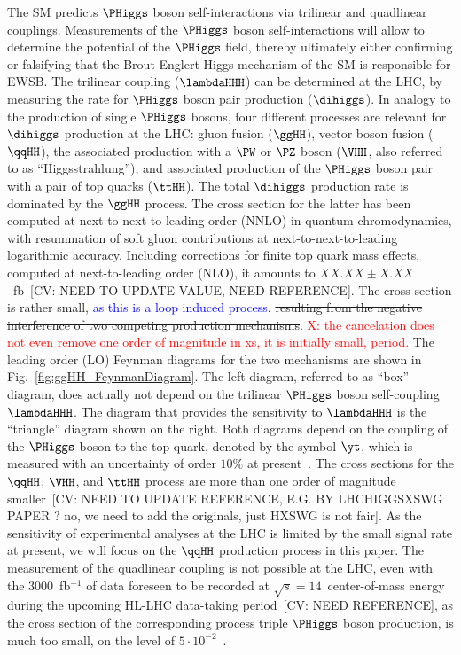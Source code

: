 The SM predicts $\PHiggs$ boson self-interactions via trilinear and quadlinear couplings. 
Measurements of the $\PHiggs$ boson self-interactions will allow to determine the potential of the $\PHiggs$ field,
thereby ultimately either confirming or falsifying that the Brout-Englert-Higgs mechanism of the SM is responsible for EWSB.
The trilinear coupling ($\lambdaHHH$) can be determined at the LHC, by measuring the rate for $\PHiggs$ boson pair production ($\dihiggs$). 
In analogy to the production of single $\PHiggs$ bosons, 
four different processes are relevant for $\dihiggs$ production at the LHC: 
gluon fusion ($\ggHH$), vector boson fusion ($\qqHH$), the associated production with a $\PW$ or $\PZ$ boson ($\VHH$, also referred to as ``Higgsstrahlung''),
and associated production of the $\PHiggs$ boson pair with a pair of top quarks ($\ttHH$).
The total $\dihiggs$ production rate is dominated by the $\ggHH$ process.
The cross section for the latter has been computed at next-to-next-to-leading order (NNLO) in quantum chromodynamics,
with resummation of soft gluon contributions at next-to-next-to-leading logarithmic accuracy.
Including corrections for finite top quark mass effects, computed at next-to-leading order (NLO),
it amounts to $XX.XX \pm X.XX$~fb~\cite{}[CV: NEED TO UPDATE VALUE, NEED REFERENCE].
The cross section is rather small, \textcolor{blue}{as this is a loop induced process.} \st{resulting from the negative interference of two competing production mechanisms}. \textcolor{red}{X: the cancelation does not even remove one order of magnitude in xs, it is initially small, period.}
The leading order (LO) Feynman diagrams for the two mechanisms are shown in Fig.~\ref{fig:ggHH_FeynmanDiagram}.
The left diagram, referred to as ``box'' diagram, does actually not depend on the trilinear $\PHiggs$ boson self-coupling $\lambdaHHH$.
The diagram that provides the sensitivity to $\lambdaHHH$ is the ``triangle'' diagram shown on the right.
Both diagrams depend on the coupling of the $\PHiggs$ boson to the top quark, denoted by the symbol $\yt$,
which is measured with an uncertainty of order $10\%$ at present~\cite{Aaboud:2018urx,HIG-17-035}.
The cross sections for the $\qqHH$, $\VHH$, and $\ttHH$ process are more than one order of magnitude smaller~\cite{Baglio:2012np}[CV: NEED TO UPDATE REFERENCE, E.G. BY LHCHIGGSXSWG PAPER ? no, we need to add the originals, just HXSWG is not fair].
As the sensitivity of experimental analyses at the LHC is limited by the small signal rate at present,
we will focus on the $\qqHH$ production process in this paper.
The measurement of the quadlinear coupling is not possible at the LHC, 
even with the $3000$~fb$^{-1}$ of data foreseen to be recorded at $\sqrt{s}=14$~\TeV center-of-mass energy during the upcoming HL-LHC data-taking period~\cite{}[CV: NEED REFERENCE],
as the cross section of the corresponding process triple $\PHiggs$ boson production, is much too small, 
on the level of $5 \cdot 10^{-2}$~\cite{Plehn:2005nk,Binoth:2006ym}.

